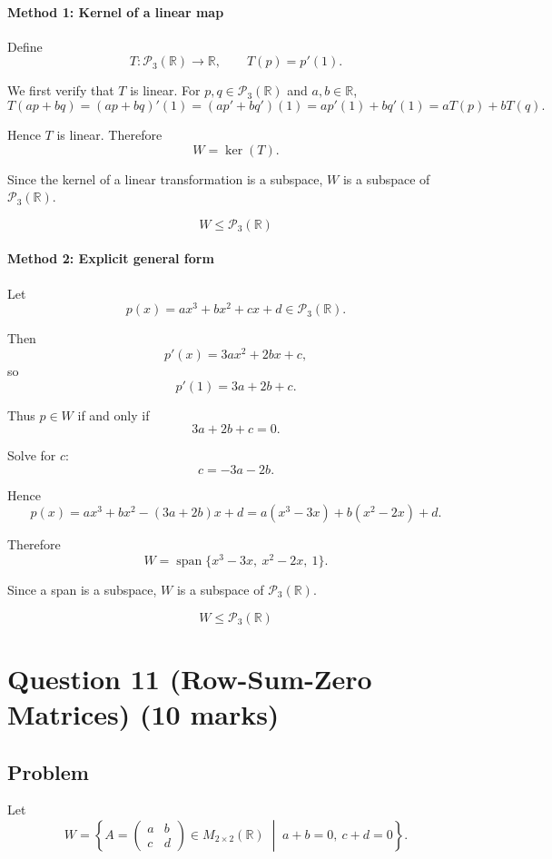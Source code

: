 \documentclass[12pt]{article}
\newcommand{\Span}{\operatorname{span}}
\begin{document}
\paragraph{Method 1: Kernel of a linear map}

Define
\[
T:\mathcal P_3(\mathbb R)\to\mathbb R,\qquad T(p)=p'(1).
\]

We first verify that \(T\) is linear. For \(p,q\in\mathcal P_3(\mathbb R)\) and \(a,b\in\mathbb R\),
\[
T(ap+bq)=(ap+bq)'(1)=(ap'+bq')(1)=a p'(1)+b q'(1)=aT(p)+bT(q).
\]

Hence \(T\) is linear. Therefore
\[
W=\ker(T).
\]

Since the kernel of a linear transformation is a subspace, \(W\) is a subspace of \(\mathcal P_3(\mathbb R)\).

\[
\boxed{W\le \mathcal P_3(\mathbb R)}
\]

\paragraph{Method 2: Explicit general form}

Let
\[
p(x)=ax^3+bx^2+cx+d\in\mathcal P_3(\mathbb R).
\]

Then
\[
p'(x)=3ax^2+2bx+c,
\]
so
\[
p'(1)=3a+2b+c.
\]

Thus \(p\in W\) if and only if
\[
3a+2b+c=0.
\]

Solve for \(c\):
\[
c=-3a-2b.
\]

Hence
\[
p(x)=ax^3+bx^2-(3a+2b)x+d
= a(x^3-3x)+b(x^2-2x)+d.
\]

Therefore
\[
W=\Span\{x^3-3x,\ x^2-2x,\ 1\}.
\]

Since a span is a subspace, \(W\) is a subspace of \(\mathcal P_3(\mathbb R)\).

\[
\boxed{W\le \mathcal P_3(\mathbb R)}
\]

\newpage
\section{Question 11 (Row-Sum-Zero Matrices) \hfill (10 marks)}
\subsection{Problem}

Let
\[
W=\left\{
A=\begin{pmatrix}
a&b\\ c&d
\end{pmatrix}\in M_{2\times2}(\mathbb R)
\;\middle|\;
a+b=0,\ c+d=0
\right\}.
\]
\end{document}
